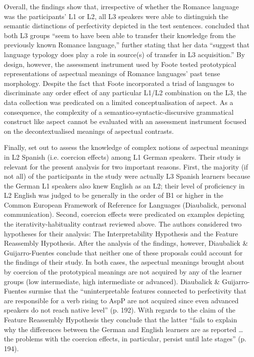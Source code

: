 \documentclass[output=paper,modfonts,nonflat,newtxmath]{langsci/langscibook}
\begin{document}
Overall, the findings show that, irrespective of whether the Romance language was the participants’ L1 or L2, all L3 speakers were able to distinguish the semantic distinctions of perfectivity depicted in the test sentences. \citet[111]{Foote2009} concluded that both L3 groups “seem to have been able to transfer their knowledge from the previously known Romance language,” further stating that her data “suggest that language typology does play a role in source(s) of transfer in L3 acquisition.” By design, however, the assessment instrument used by Foote tested prototypical representations of aspectual meanings of Romance languages’ past tense morphology. Despite the fact that Foote incorporated a triad of languages to discriminate any order effect of any particular L1/L2 combination on the L3, the data collection was predicated on a limited conceptualisation of aspect. As a consequence, the complexity of a semantico-syntactic-discursive grammatical construct like aspect cannot be evaluated with an assessment instrument focused on the decontextualised meanings of aspectual contrasts.

Finally, \citet{DiaubalickGuijarro-Fuentes2016} set out to assess the knowledge of complex notions of aspectual meanings in L2 Spanish (i.e. coercion effects) among L1 German speakers. Their study is relevant for the present analysis for two important reasons. First, the majority (if not all) of the participants in the study were actually L3 Spanish learners because the German L1 speakers also knew English as an L2; their level of proficiency in L2 English was judged to be generally in the order of B1 or higher in the Common European Framework of Reference for Languages (Diaubalick, personal communication). Second, coercion effects were predicated on examples depicting the iterativity-habituality contrast reviewed above. The authors considered two hypotheses for their analysis: The Interpretability Hypothesis and the Feature Reassembly Hypothesis. After the analysis of the findings, however, Diaubalick \& Guijarro-Fuentes conclude that neither one of these proposals could account for the findings of their study. In both cases, the aspectual meanings brought about by coercion of the prototypical meanings are not acquired by any of the learner groups (low intermediate, high intermediate or advanced). Diaubalick \& Guijarro-Fuentes surmise that the “uninterpretable features connected to perfectivity that are responsible for a verb rising to AspP are not acquired since even advanced speakers do not reach native level” (p. 192). With regards to the claim of the Feature Reassembly Hypothesis they conclude that the latter “fails to explain why the differences between the German and English learners are as reported … the problems with the coercion effects, in particular, persist until late stages” (p. 194).
\end{document}
